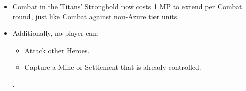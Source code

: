 \begin{itemize}
    \item Combat in the Titans' Stronghold now costs 1 MP to extend per Combat round, just like Combat against non-Azure tier units.
    \item Additionally, no player can:
    \begin{itemize}
        \item Attack other Heroes.
        \item Capture a Mine or Settlement that is already controlled.
    \end{itemize}.
\end{itemize}



\newpage

